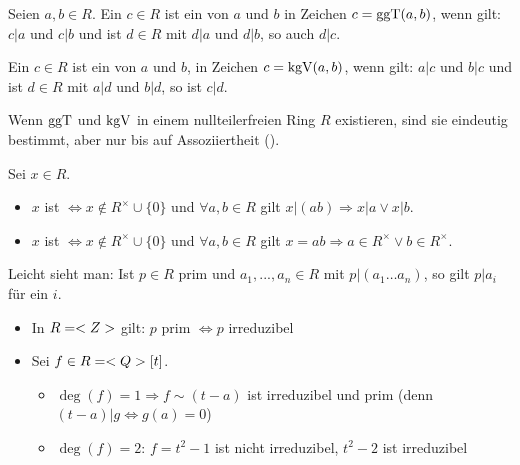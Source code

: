 \begin{definition}
	Seien $a,b\in R$. Ein $c\in R$ ist ein  von $a$ und $b$ in Zeichen $c=\operatorname{ggT}(a,b)$, wenn gilt: $c\vert a$ und $c\vert b$ und ist $d\in R$ mit $d\vert a$ und $d\vert b$, so auch $d\vert c$.
	
	Ein $c\in R$ ist ein  von $a$ und $b$, in Zeichen $c=\operatorname{kgV}(a,b)$, wenn gilt: $a\vert c$ und $b\vert c$ und ist $d\in R$ mit $a\vert d$ und $b\vert d$, so ist $c\vert d$.
\end{definition}

\begin{remark}
	Wenn $\operatorname{ggT}$ und $\operatorname{kgV}$ in einem nullteilerfreien Ring $R$ existieren, sind sie eindeutig bestimmt, aber nur bis auf Assoziiertheit ().
\end{remark}

\begin{definition}
	Sei $x\in R$. 
	\begin{itemize}
		\item $x$ ist  $\iff x\notin R^\times\cup \{0\}$ und $\forall a,b\in R$ gilt $x\vert (ab)\Rightarrow x\vert a\lor x\vert b$.
		\item $x$ ist  $\iff x\notin R^\times\cup \{0\}$ und $\forall a,b\in R$ gilt $x=ab\Rightarrow a\in R^\times \lor b\in R^\times$.
	\end{itemize}
\end{definition}

\begin{remark}
	Leicht sieht man: Ist $p\in R$ prim und $a_1,...,a_n\in R$ mit $p\vert (a_1\dots a_n)$, so gilt $p\vert a_i$ für ein $i$.
\end{remark}

\begin{example}
	\begin{itemize}
		\item In $R=<Z>$ gilt: $p$ prim $\iff p$ irreduzibel
		\item Sei $f\in R=<Q>[t]$.
		\begin{itemize}
			\item $\deg(f)=1\Rightarrow f\sim (t-a)$ ist irreduzibel und prim (denn $(t-a)\vert g\iff g(a)=0$)
			\item $\deg(f)=2$: $f=t^2-1$ ist nicht irreduzibel, $t^2-2$ ist irreduzibel
		\end{itemize}
	\end{itemize}
\end{example}